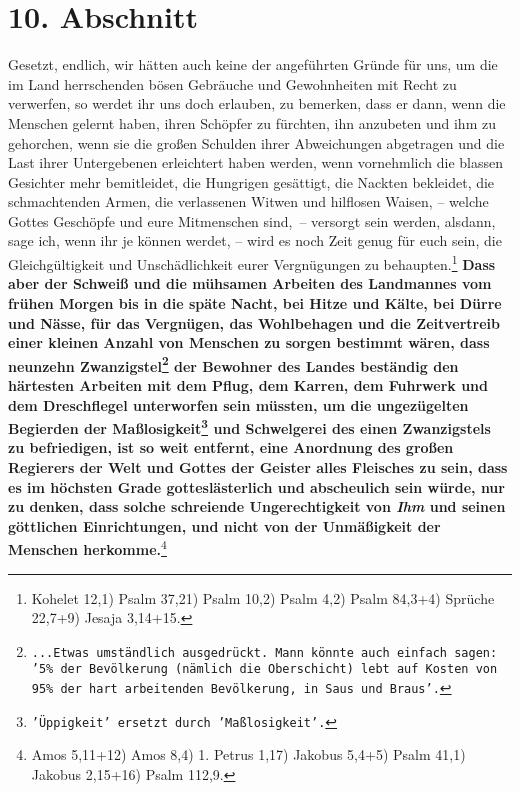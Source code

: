 \section{10. Abschnitt} \label{kap18_ab10}

Gesetzt, endlich, wir hätten auch keine der angeführten Gründe für uns, um die
im Land herrschenden bösen Gebräuche und Gewohnheiten mit Recht zu verwerfen,
so werdet ihr uns doch erlauben, zu bemerken, dass er dann, wenn die Menschen
gelernt haben, ihren Schöpfer zu fürchten, ihn anzubeten und ihm zu
gehorchen, wenn sie die großen Schulden ihrer Abweichungen abgetragen und die
Last ihrer Untergebenen erleichtert haben werden, wenn vornehmlich die blassen
Gesichter mehr bemitleidet, die Hungrigen gesättigt, die Nackten bekleidet, die
schmachtenden Armen, die verlassenen Witwen und hilflosen Waisen, -- welche
Gottes Geschöpfe und eure Mitmenschen sind,~-- versorgt sein werden, alsdann,
sage ich, wenn ihr je können werdet, -- wird es noch Zeit genug für euch sein,
die Gleichgültigkeit und Unschädlichkeit eurer Vergnügungen zu
behaupten.\footnote{
Kohelet 12,1)
Psalm 37,21)
Psalm 10,2)
Psalm 4,2)
Psalm 84,3+4)
Sprüche 22,7+9)
Jesaja 3,14+15.}
\label{ref:18_10_ungeraechtikeit} \textbf{Dass aber der Schweiß und die mühsamen
Arbeiten
des Landmannes vom frühen Morgen bis in die späte Nacht, bei Hitze und Kälte,
bei Dürre und Nässe, für das Vergnügen, das Wohlbehagen und die Zeitvertreib
einer kleinen Anzahl von Menschen zu sorgen bestimmt wären, dass neunzehn
Zwanzigstel\footnote{\texttt{...Etwas umständlich ausgedrückt. Mann könnte auch
einfach sagen: '5\% der Bevölkerung (nämlich die Oberschicht) lebt auf Kosten
von 95\% der hart arbeitenden Bevölkerung, in Saus und Braus'.}} der Bewohner
des Landes beständig den härtesten Arbeiten mit dem
Pflug, dem Karren, dem Fuhrwerk und dem Dreschflegel unterworfen sein müssten,
um
die ungezügelten Begierden der Maßlosigkeit\footnote{\texttt{'Üppigkeit' ersetzt
durch 'Maßlosigkeit'.}} und Schwelgerei des
einen Zwanzigstels
zu befriedigen, ist so weit entfernt, eine Anordnung des großen Regierers der
Welt und Gottes der Geister alles Fleisches zu sein, dass es im höchsten Grade
gotteslästerlich und abscheulich sein würde, nur zu denken, dass solche
schreiende Ungerechtigkeit von \textit{Ihm} und seinen göttlichen Einrichtungen,
und
nicht von der Unmäßigkeit der Menschen herkomme.}\footnote{
Amos 5,11+12)
Amos 8,4)
1. Petrus 1,17)
Jakobus 5,4+5)
Psalm 41,1)
Jakobus 2,15+16)
Psalm 112,9.}
